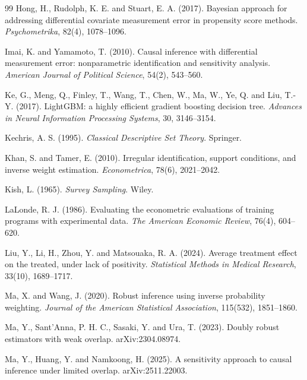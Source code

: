 \documentclass[twoside,11pt]{article}
\theoremstyle{plain}
\theoremstyle{definition}
\begin{document}
\begin{thebibliography}{99}
 Hong, H., Rudolph, K. E. and Stuart, E. A. (2017). Bayesian approach for addressing differential covariate measurement error in propensity score methods. \emph{Psychometrika}, 82(4), 1078--1096.

 Imai, K. and Yamamoto, T. (2010). Causal inference with differential measurement error: nonparametric identification and sensitivity analysis. \emph{American Journal of Political Science}, 54(2), 543--560.

 Ke, G., Meng, Q., Finley, T., Wang, T., Chen, W., Ma, W., Ye, Q. and Liu, T.-Y. (2017). LightGBM: a highly efficient gradient boosting decision tree. \emph{Advances in Neural Information Processing Systems}, 30, 3146--3154.

 Kechris, A. S. (1995). \emph{Classical Descriptive Set Theory}. Springer.

 Khan, S. and Tamer, E. (2010). Irregular identification, support conditions, and inverse weight estimation. \emph{Econometrica}, 78(6), 2021--2042.

 Kish, L. (1965). \emph{Survey Sampling}. Wiley.

 LaLonde, R. J. (1986). Evaluating the econometric evaluations of training programs with experimental data. \emph{The American Economic Review}, 76(4), 604--620.

 Liu, Y., Li, H., Zhou, Y. and Matsouaka, R. A. (2024). Average treatment effect on the treated, under lack of positivity. \emph{Statistical Methods in Medical Research}, 33(10), 1689--1717.

 Ma, X. and Wang, J. (2020). Robust inference using inverse probability weighting. \emph{Journal of the American Statistical Association}, 115(532), 1851--1860.

 Ma, Y., Sant'Anna, P. H. C., Sasaki, Y. and Ura, T. (2023). Doubly robust estimators with weak overlap. arXiv:2304.08974.

 Ma, Y., Huang, Y. and Namkoong, H. (2025). A sensitivity approach to causal inference under limited overlap. arXiv:2511.22003.


\end{thebibliography}
\end{document}
